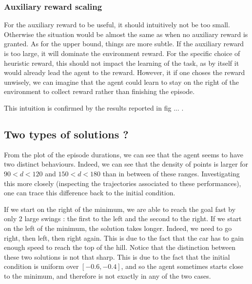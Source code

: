 \documentclass[a4paper, 12pt,oneside]{article}
\begin{document}
        \subsubsection{Auxiliary reward scaling}
        For the auxiliary reward to be useful, it should intuitively not be too small. Otherwise the situation would be almost the same as when no auxiliary reward is granted. As for the upper bound, things are more subtle. If the auxiliary reward is too large, it will dominate the environment reward. For the specific choice of heuristic reward, this should not impact the learning of the task, as by itself it would already lead the agent to the reward. However, it if one choses the reward unwisely, we can imagine that the agent could learn to stay on the right of the environment to collect reward rather than finishing the episode.

        This intuition is confirmed by the results reported in fig ... . 
        \subsection{Two types of solutions ?}
        From the plot of the episode durations, we can see that the agent seems to have two distinct behaviours. Indeed, we can see that the density of points is larger for $90<d<120$ and $150<d<180$ than in between of these ranges. Investigating this more closely (inspecting the trajectories associated to these performances), one can trace this difference back to the initial condition. 
        
        If we start on the right of the minimum, we are able to reach the goal fast by only 2 large swings : the first to the left and the second to the right. If we start on the left of the minimum, the solution takes longer. Indeed, we need to go right, then left, then right again. This is due to the fact that the car has to gain enough speed to reach the top of the hill.
        Notice that the distinction between these two solutions is not that sharp. This is due to the fact that the initial condition is uniform over $[-0.6,-0.4]$, and so the agent sometimes starts close to the minimum, and therefore is not exactly in any of the two cases. 
\end{document}
